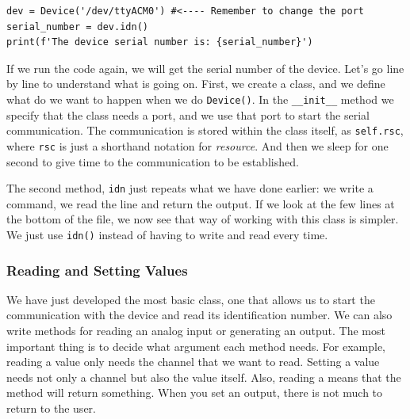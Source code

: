 \begin{verbatim}
dev = Device('/dev/ttyACM0') #<---- Remember to change the port
serial_number = dev.idn()
print(f'The device serial number is: {serial_number}')
\end{verbatim}

If we run the code again, we will get the serial number of the device. Let's go line by line to understand what is going on. First, we create a class, and we define what do we want to happen when we do \texttt{Device()}. In the \texttt{\_\_init\_\_} method we specify that the class needs a port, and we use that port to start the serial communication. The communication is stored within the class itself, as \texttt{self.rsc}, where \texttt{rsc} is just a shorthand notation for \textit{resource}. And then we sleep for one second to give time to the communication to be established.

The second method, \texttt{idn} just repeats what we have done earlier: we write a command, we read the line and return the output. If we look at the few lines at the bottom of the file, we now see that way of working with this class is simpler. We just use \texttt{idn()} instead of having to write and read every time.



\subsubsection{Reading and Setting Values}
We have just developed the most basic class, one that allows us to start the communication with the device and read its identification number. We can also write methods for reading an analog input or generating an output. The most important thing is to decide what argument each method needs. For example, reading a value only needs the channel that we want to read. Setting a value needs not only a channel but also the value itself. Also, reading a means that the method will return something. When you set an output, there is not much to return to the user.

